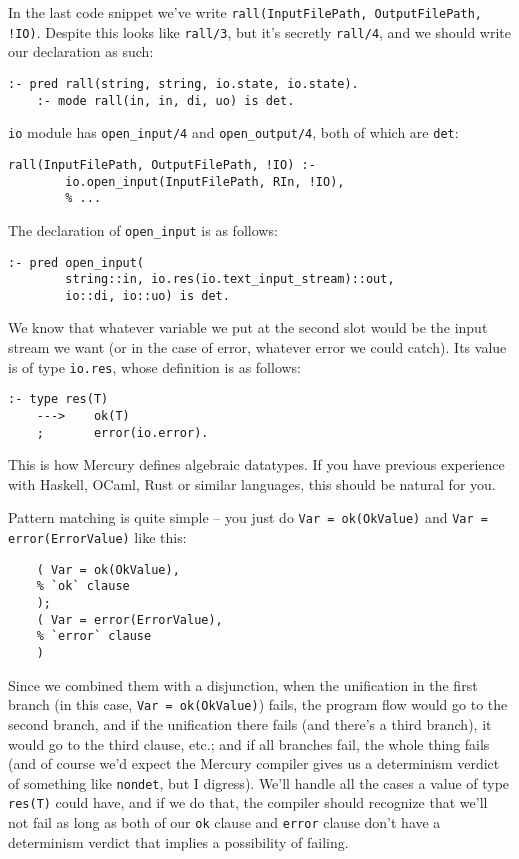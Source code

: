 In the last code snippet we've write \texttt{rall(InputFilePath, OutputFilePath, !IO)}. Despite this looks like \texttt{rall/3}, but it's secretly \texttt{rall/4}, and we should write our declaration as such:

\begin{lstlisting}[language=Mercury]
	:- pred rall(string, string, io.state, io.state).
	:- mode rall(in, in, di, uo) is det.
\end{lstlisting}

\texttt{io} module has \texttt{open\_input/4} and \texttt{open\_output/4}, both of which are \texttt{det}:

\begin{lstlisting}[language=Mercury]
	rall(InputFilePath, OutputFilePath, !IO) :-
        io.open_input(InputFilePath, RIn, !IO),
	    % ...
\end{lstlisting}

The declaration of \texttt{open\_input} is as follows:

\begin{lstlisting}[language=Mercury]
	:- pred open_input(
	    string::in, io.res(io.text_input_stream)::out,
	    io::di, io::uo) is det.
\end{lstlisting}

We know that whatever variable we put at the second slot would be the input stream we want (or in the case of error, whatever error we could catch). Its value is of type \texttt{io.res}, whose definition is as follows:

\begin{lstlisting}[language=Mercury]
	:- type res(T)
	--->    ok(T)
	;       error(io.error).
\end{lstlisting}

This is how Mercury defines algebraic datatypes. If you have previous experience with Haskell, OCaml, Rust or similar languages, this should be natural for you.

Pattern matching is quite simple -- you just do \texttt{Var = ok(OkValue)} and \texttt{Var = error(ErrorValue)} like this:

\begin{lstlisting}[language=Mercury]
	% ...
	( Var = ok(OkValue),
	% `ok` clause
	);
	( Var = error(ErrorValue),
	% `error` clause
	)
\end{lstlisting}

Since we combined them with a disjunction, when the unification in the first branch (in this case, \texttt{Var = ok(OkValue)}) fails, the program flow would go to the second branch, and if the unification there fails (and there's a third branch), it would go to the third clause, etc.; and if all branches fail, the whole thing fails (and of course we'd expect the Mercury compiler gives us a determinism verdict of something like \texttt{nondet}, but I digress). We'll handle all the cases a value of type \texttt{res(T)} could have, and if we do that, the compiler should recognize that we'll not fail as long as both of our \texttt{ok} clause and \texttt{error} clause don't have a determinism verdict that implies a possibility of failing.


